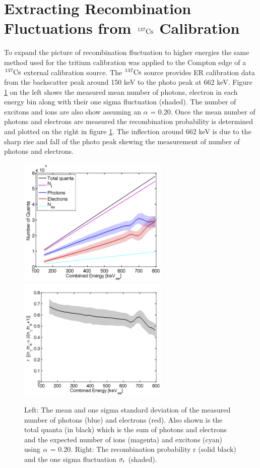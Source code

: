 \newpage

\section{Extracting Recombination Fluctuations from $\rm ^{137}Cs$ Calibration}

To expand the picture of recombination fluctuation to higher energies the same method used for the tritium calibration was applied to the Compton edge of a $\rm ^{137}Cs$ external calibration source. The $\rm ^{137}Cs$ source provides ER calibration data from the backscatter peak around 150 keV to the photo peak at 662 keV. Figure \ref{fig:Cs_LYQYR} on the left shows the measured mean number of photons, electron in each energy bin along with their one sigma fluctuation (shaded). The number of excitons and ions are also show assuming an $\alpha$ = 0.20. Once the mean number of photons and electrons are measured the recombination probability is determined and plotted on the right in figure \ref{fig:Cs_LYQYR}. The inflection around 662 keV is due to the sharp rise and fall of the photo peak skewing the measurement of number of photons and electrons.

\begin{figure}[h!]\centering
\includegraphics[width=72mm]{Chapter_Flucs/Figures/Cs/quanta_cs_.png}
\includegraphics[width=72mm]{Chapter_Flucs/Figures/Cs/R_cs_.png}
\caption{ Left: The mean and one sigma standard deviation of the measured number of photons (blue) and electrons (red). Also shown is the total quanta (in black) which is the sum of photons and electrons and the expected number of ions (magenta) and excitons (cyan) using $\rm \alpha$ = 0.20. Right: The recombination probability r (solid black) and the one sigma fluctuation $\rm \sigma_{r}$ (shaded). }
\label{fig:Cs_LYQYR}
\end{figure}

